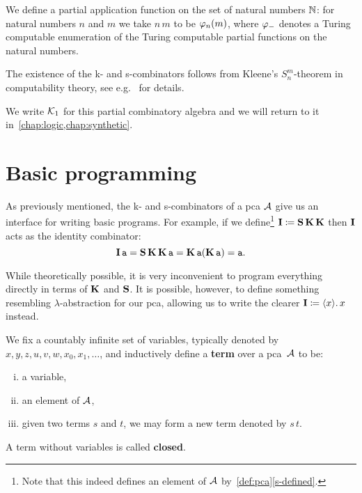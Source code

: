 \begin{example}\label{ex:Kleene-1}
  We define a partial application function on the set of natural numbers
  \(\Nat\): for natural numbers \(n\) and \(m\) we take \(n\,m\) to be
  \(\prenum{n}(m)\), where \(\prenum{-}\) denotes a Turing computable
  enumeration of the Turing computable partial functions on the natural numbers.

  The existence of the k- and s-combinators follows from Kleene's
  \(S^m_n\)-theorem in computability theory, see e.g.~\cite[Section~2.5.1 and
  Theorem~2.1.5]{Bauer2023} for details.

  We write \(\Kone\) for this partial combinatory algebra and we will return to
  it in~\cref{chap:logic,chap:synthetic}.
\end{example}

\section{Basic programming}

As previously mentioned, the k- and s-combinators of a pca \(\AA\) give us an
interface for writing basic programs. For example, if we define\footnote{Note
  that this indeed defines an element of \(\AA\)
  by~\cref{def:pca}\ref{s-defined}.}
\(\icomb \coloneq \scomb\kcomb\kcomb\) then \(\icomb\) acts as the
identity combinator:
\[
  \icomb\pca{a} = \scomb\kcomb\kcomb\pca{a} = \kcomb\pca{a}(\kcomb\pca{a}) =
  {\pca{a}}.
\]

While theoretically possible, it is very inconvenient to program everything
directly in terms of \(\kcomb\) and \(\scomb\). It is possible, however, to
define something resembling \(\lambda\)-abstraction for our pca, allowing us to
write the clearer \(\icomb \coloneq \lambdapca{x}{\var{x}}\) instead.

\begin{definition}
  We fix a countably infinite set of variables, typically denoted by
  \(x,y,z,u,v,w,x_0,x_1,\dots\), and inductively define a \textbf{term} over a
  pca~\(\AA\) to be:
  \begin{enumerate}[(i)]
  \item a variable,
  \item an element of \(\AA\),
  \item given two terms \(s\) and \(t\), we may form a new term denoted by \(s\,t\).
  \end{enumerate}
  A term without variables is called \textbf{closed}.
\end{definition}

